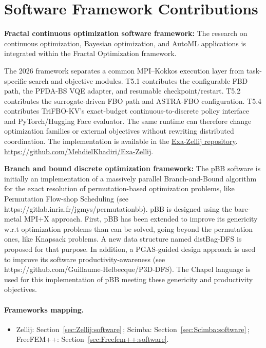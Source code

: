 \section{Software Framework Contributions}

{\bf Fractal continuous optimization software framework:} The research on continuous optimization, Bayesian optimization, and AutoML applications is integrated within the Fractal Optimization framework.

The 2026 framework separates a common MPI--Kokkos execution layer from task-specific search and objective modules. T5.1 contributes the configurable FBD path, the PFDA-BS VQE adapter, and resumable
checkpoint/restart. T5.2 contributes the surrogate-driven FBO path and ASTRA-FBO configuration. T5.4 contributes TriFBO-KV's exact-budget continuous-to-discrete policy interface and PyTorch/Hugging Face
evaluator. The same runtime can therefore change optimization families or external objectives without rewriting distributed coordination. The implementation is available in the \href{https://github.com/MehdielKhadiri/Exa-Zellij}{Exa-Zellij repository}.
\url{https://github.com/MehdielKhadiri/Exa-Zellij}.

\medskip

{\bf Branch and bound discrete optimization framework:} The pBB software
is initially an implementation of a massively parallel Branch-and-Bound
algorithm for
the exact resolution of permutation-based optimization problems, like
Permutation Flow-shop
Scheduling (see https://gitlab.inria.fr/jgmys/permutationbb). pBB is
designed using
the bare-metal MPI+X approach. First, pBB has been extended to improve
its genericity w.r.t
optimization problems than can be solved, going beyond the permutation
ones, like Knapsack
problems. A new data structure named distBag-DFS is proposed for that
purpose. In addition,
a PGAS-guided design approach is used to improve its software
productivity-awareness (see
https://github.com/Guillaume-Helbecque/P3D-DFS). The Chapel language is
used for this
implementation of pBB meeting these genericity and productivity objectives.

\medskip


\paragraph{Frameworks mapping.}
\begin{itemize}
     \item Zellij: Section~\ref{sec:Zellij:software}\,; Scimba:
Section~\ref{sec:Scimba:software}\,; FreeFEM++:
Section~\ref{sec:Freefem++:software}.
\end{itemize}


